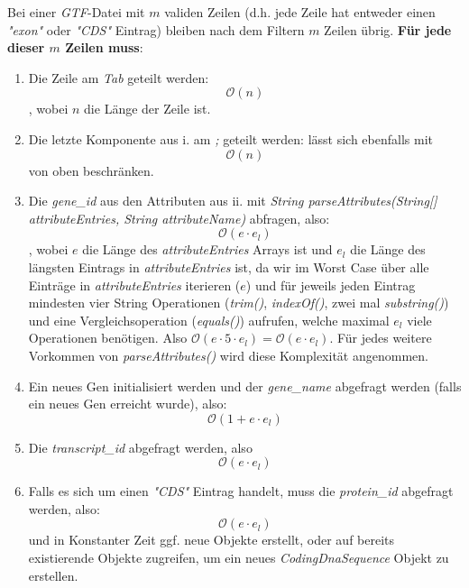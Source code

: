 \documentclass[12pt]{article}
\begin{document}
\begin{enumerate}
		Bei einer \textit{GTF}-Datei mit $m$ validen Zeilen (d.h. jede Zeile hat entweder einen \textit{"exon"} oder \textit{"CDS"} Eintrag) bleiben
		nach dem Filtern $m$ Zeilen übrig.
		\textbf{Für jede dieser $m$ Zeilen muss}:
		\begin{enumerate}
			\item Die Zeile am \textit{Tab} geteilt werden:
			      \begin{equation}
                      \mathcal{O}(n)
			      \end{equation}\cite{stackoverflow_split_complexity}
			      , wobei $n$ die Länge der Zeile ist.
			\item Die letzte Komponente aus i. am \textit{;} geteilt werden: lässt sich ebenfalls mit
			      \begin{equation}
				      \mathcal{O}(n)
			      \end{equation}
			      von oben beschränken.
			\item Die \textit{gene\_id} aus den Attributen aus ii. mit \textit{String parseAttributes(String[] attributeEntries, String attributeName)}
			      abfragen, also:
			      \begin{equation}
				      \mathcal{O}(e \cdot e_{l})
			      \end{equation}
			      , wobei $e$ die Länge des \textit{attributeEntries} Arrays ist und
			      $e_{l}$ die Länge des längsten Eintrags in \textit{attributeEntries} ist, da wir im Worst Case
			      über alle Einträge in \textit{attributeEntries} iterieren ($e$) und für jeweils jeden Eintrag
			      mindesten vier String Operationen (\textit{trim()}, \textit{indexOf()}, zwei mal \textit{substring()})
			      und eine Vergleichsoperation (\textit{equals()}) aufrufen, welche maximal $e_{l}$ viele
			      Operationen benötigen. Also $\mathcal{O}(e \cdot 5 \cdot e_{l}) = \mathcal{O}(e \cdot e_{l})$.
			      Für jedes weitere Vorkommen von \textit{parseAttributes()} wird diese Komplexität angenommen.
			\item Ein neues Gen initialisiert werden und der \textit{gene\_name} abgefragt werden (falls ein neues Gen erreicht wurde), also:
			      \begin{equation}
				      \mathcal{O}(1 + e \cdot e_{l})
			      \end{equation}
			\item Die \textit{transcript\_id} abgefragt werden, also
			      \begin{equation}
				      \mathcal{O}(e \cdot e_{l})
			      \end{equation}
			\item Falls es sich um einen \textit{"CDS"} Eintrag handelt, muss die \textit{protein\_id} abgefragt werden, also:
			      \begin{equation}
				      \mathcal{O}(e \cdot e_{l})
			      \end{equation}
			      und in Konstanter Zeit ggf. neue Objekte erstellt, oder auf bereits existierende Objekte
			      zugreifen, um ein neues \textit{CodingDnaSequence} Objekt zu erstellen.
		\end{enumerate}


\end{enumerate}
\end{document}
